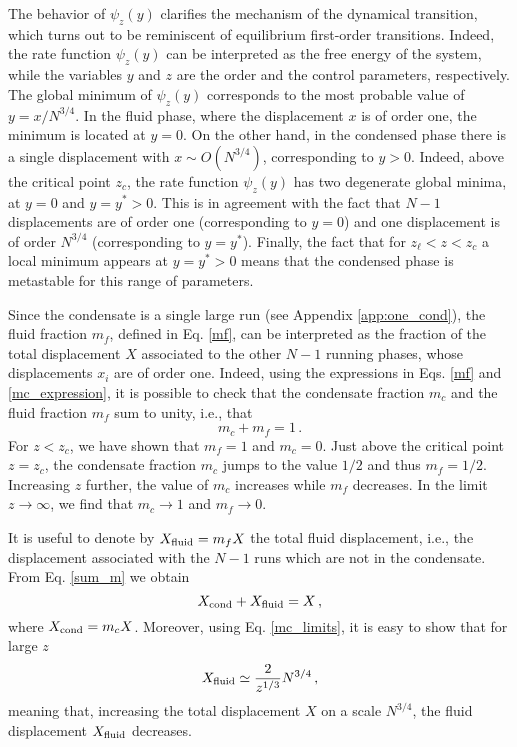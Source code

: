 \documentclass[aps,pre,twocolumn,superscriptaddress,showpacs]{revtex4-1}
\newcommand{\be}{\begin{equation}}
\newcommand{\ee}{\end{equation}}
\begin{document}
The behavior of $\psi_z(y)$ clarifies the mechanism of the dynamical transition, which turns out to be reminiscent of equilibrium first-order transitions. Indeed, the rate function $\psi_z(y)$ can be interpreted as the free energy of the system, while the variables $y$ and $z$ are the order and the control parameters, respectively. The global minimum of $\psi_z(y)$ corresponds to the most probable value of $y=x/N^{3/4}$. In the fluid phase, where the displacement $x$ is of order one, the minimum is located at $y=0$. On the other hand, in the condensed phase there is a single displacement with $x\sim O(N^{3/4})$, corresponding to $y>0$. Indeed, above the critical point $z_c$, the rate function $\psi_z(y)$ has two degenerate global minima, at $y=0$ and $y=y^*>0$. This is in agreement with the fact that $N-1$ displacements are of order one (corresponding to $y=0$) and one displacement is of order $N^{3/4}$ (corresponding to $y=y^*$). Finally, the fact that for $z_{\ell}<z<z_c$ a local minimum appears at $y=y^*>0$ means that the condensed phase is metastable for this range of parameters. 





Since the condensate is a single large run (see Appendix \ref{app:one_cond}), the fluid fraction $m_f$, defined in Eq. \eqref{mf}, can be interpreted as the fraction of the total displacement $X$ associated to the other $N-1$ running phases, whose displacements $x_i$ are of order one. Indeed, using the expressions in Eqs. \eqref{mf} and \eqref{mc_expression}, it is possible to check that the condensate fraction $m_c$ and the fluid fraction $m_f$ sum to unity, i.e., that
\begin{equation}
m_c+m_f=1\,.
\label{sum_m}
\end{equation}
For $z<z_c$, we have shown that $m_f=1$ and $m_c=0$. Just above the critical point $z=z_c$, the condensate fraction $m_c$ jumps to the value $1/2$ and thus $m_f=1/2$. Increasing $z$ further, the value of $m_c$ increases while $m_f$ decreases. In the limit $z\to \infty$, we find that $m_c\to 1$ and $m_f\to 0$. 


It is useful to denote by $X_{\rm fluid}=m_f X$ the total fluid displacement, i.e., the displacement associated with the $N-1$ runs which are not in the condensate. From Eq. \eqref{sum_m} we obtain
\begin{equation}
X_{\rm cond}+X_{\rm fluid}=X\,,
\end{equation}
where $X_{\rm cond}=m_c X$. Moreover, using Eq. \eqref{mc_limits}, it is easy to show that for large $z$
\be
X_{\rm fluid}\simeq \frac{2}{z^{1/3}}N^{3/4}\,,
\ee
meaning that, increasing the total displacement $X$ on a scale $N^{3/4}$, the fluid displacement $X_{\rm fluid}$ decreases. 
\end{document}
